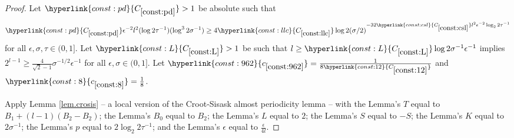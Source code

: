 \documentclass[12pt,reqno]{amsart}
\numberwithin{equation}{section}
\newcommand{\refconstlittle}[1]{%
    \hyperlink{const:#1}{c_{\ref{const:#1}}}%
}
\newcommand{\refconstbig}[1]{%
    \hyperlink{const:#1}{C_{\ref{const:#1}}}%
}
\begin{document}
\begin{proof}
Let $\refconstbig{pd}>1$ be absolute such that
\begin{equation}\label{eqn.hi}
\refconstbig{pd}\epsilon^{-2}l^2(\log 2\tau^{-1})(\log^3 2 \sigma^{-1})\geq  4\refconstbig{llc}\log 2(\sigma/2)^{-32\refconstbig{csl}l^2\epsilon^{-2}\log_2 2\tau^{-1}}
\end{equation}
for all $\epsilon,\sigma,\tau \in (0,1]$. Let $\refconstbig{L}>1$ be such that $l \geq \refconstbig{L}\log 2\sigma^{-1}\epsilon^{-1}$ implies $2^{l-1} \geq \frac{4}{\sqrt{2}-1}\sigma^{-1/2}\epsilon^{-1}$ for all $\epsilon,\sigma \in (0,1]$.  Let $\refconstlittle{962}=\frac{1}{8\refconstbig{12}}$ and $\refconstlittle{8}=\frac{1}{8}$.

Apply Lemma \ref{lem.crosis} -- a local version of the Croot-Sisask almost periodicity lemma -- with the Lemma's $T$ equal to $B_1+(l-1)(B_2-B_2)$; the Lemma's ${B_0}$ equal to $B_2$; the Lemma's $L$ equal to $2$; the Lemma's $S$ equal to $-S$; the Lemma's $K$ equal to $2\sigma^{-1}$; the Lemma's $p$ equal to $2\log_2 2\tau^{-1}$; and the Lemma's $\epsilon$ equal to $\frac{\epsilon}{4l}$.


\end{proof}
\end{document}
